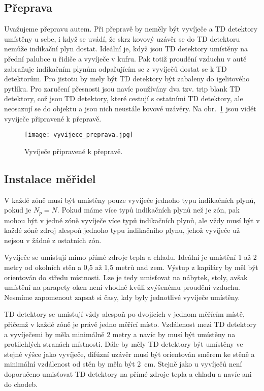 \subsection{Přeprava}
Uvažujeme přepravu autem. Při přepravě by neměly být vyvíječe a TD detektory umístěny u sebe, i když se uvádí, že skrz kovový uzávěr se do TD detektoru nemůže indikační plyn dostat. Ideální je, když jsou TD detektory umístěny na přední palubce u řidiče a vyvíječe v kufru. Pak totiž proudění vzduchu v autě zabraňuje indikačním plynům odpařujícím se z vyvíječů dostat se k TD detektorům. Pro jistotu by mely být TD detektory být zabaleny do igelitového pytlíku. Pro zaručení přesnosti jsou navíc používány dva tzv. trip blank TD detektory, což jsou TD detektory, které cestují s ostatními TD detektory, ale neosazují se do objektu a jsou nich neustále kovové uzávěry. Na obr.~\ref{fig:prutoky_vyvijecePreprava} jsou vidět vyvíječe připravené k přepravě.
\begin{figure}[ht]
    \centering
    \texttt{[image: vyvijece\_preprava.jpg]}
    \caption{Vyvíječe připravené k přepravě.}
    \label{fig:prutoky_vyvijecePreprava}
\end{figure}
\subsection{Instalace měřidel}\label{navesti:prutoky_instalace}
V každé zóně musí být umístěny pouze vyvíječe jednoho typu indikačních plynů, pokud je $N_p=N$. Pokud máme více typů indikačních plynů než je zón, pak mohou být v jedné zóně vyvíječe více typů indikačních plynů, ale vždy musí být v každé zóně zdroj alespoň jednoho typu indikačního plynu, jehož vyvíječe už nejsou v žádné z ostatních zón.

Vyvíječe se umisťují mimo přímé zdroje tepla a chladu. Ideální je umístění 1 až 2 metry od okolních stěn a 0,5 až 1,5 metrů nad zem. Výstup z kapiláry by měl být orientován do středu místnosti. Lze je tedy umisťovat na nábytek, stoly, avšak umístění na parapety oken není vhodné kvůli zvýšenému proudění vzduchu. Nesmíme zapomenout zapsat si časy, kdy byly jednotlivé vyvíječe umístěny.

TD detektory se umisťují vždy alespoň po dvojicích v jednom měřícím místě, přičemž v každé zóně je právě jedno měřící místo. Vzdálenost mezi TD detektory a vyvíječemi by měla minimálně 2 metry a navíc by musí být umístěny na protilehlých stranách místnosti. Dále by měly TD detektory být umístěny ve stejné výšce jako vyvíječe, difúzní uzávěr musí být orientován směrem ke stěně a minimální vzdálenost od stěn by měla být 2~cm. Stejně jako u vyvíječů není doporučeno umisťovat TD detektory na přímé zdroje tepla a chladu a navíc ani do chodeb.

